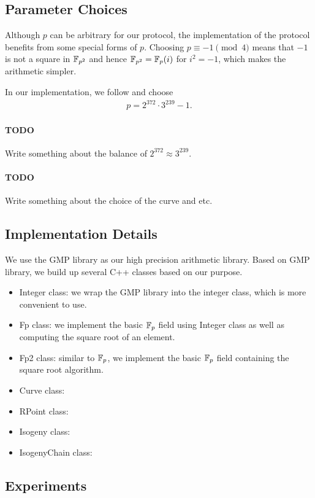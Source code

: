 
\subsection{Parameter Choices}

Although $p$ can be arbitrary for our protocol, the implementation of the protocol benefits from some special forms of $p$. Choosing $p \equiv -1 \pmod 4$ means that $-1$ is not a square in $\mathbb{F}_{p^2}$ and hence $\mathbb{F}_{p^2} = \mathbb{F}_p(i)$ for $i^2 = -1$, which makes the arithmetic simpler.

In our implementation, we follow \cite{C:CosLonNae16} and choose
\begin{align*}
    p = 2^{372} \cdot 3^{239} - 1.
\end{align*}

\paragraph{TODO} Write something about the balance of $2^{372} \approx 3^{239}$.

\paragraph{TODO} Write something about the choice of the curve and etc.

\subsection{Implementation Details}

We use the GMP library \cite{Granlund12} as our high precision arithmetic library. Based on GMP library, we build up several C++ classes based on our purpose.

\begin{itemize}
    \item Integer class: we wrap the GMP library into the integer class, which is more convenient to use.
    \item Fp class: we implement the basic $\mathbb{F}_p$ field using Integer class as well as computing the square root of an element.
    \item Fp2 class: similar to $\mathbb{F}_p$, we implement the basic $\mathbb{F}_p$ field containing the square root algorithm.
    \item Curve class:
    \item RPoint class:
    \item Isogeny class:
    \item IsogenyChain class:
\end{itemize}

\subsection{Experiments}